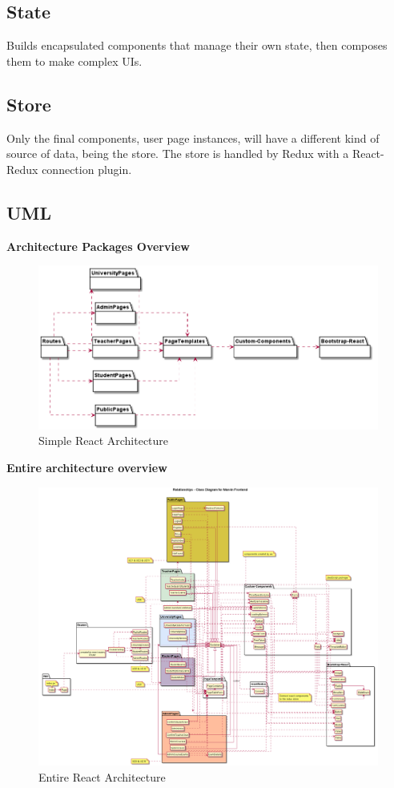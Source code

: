\documentclass[../react]{subfiles}
\begin{document}
	\subsection{State}
	Builds encapsulated components that manage their own state, then composes them to make complex UIs.

	\subsection{Store}
	Only the final components, user page instances, will have a different kind of source of data, being the store.
	The store is handled by Redux with a React-Redux connection plugin.
	
	\subsection{UML} %
	
	\textbf{Architecture Packages Overview}
	\begin{figure}[H]
		\centering
		\includegraphics[width=1\linewidth]{"diagrammi/react/simplearch"}
		\caption{Simple React Architecture}
		\label{fig:Simple React Architecture}
	\end{figure}
	
	\newpage
	\textbf{Entire architecture overview}
	\begin{figure}[H]
		\centering
		\includegraphics[width=1\linewidth]{"diagrammi/react/arch"}
		\caption{Entire React Architecture}
		\label{fig:Entire React Architecture}
	\end{figure}
\end{document}
